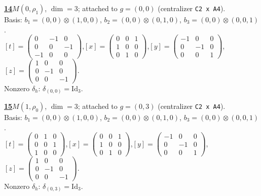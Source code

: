 \begin{samepage}\noindent\textbf{\underline{14}}\quad $M(0,\rho_{1})$, $\dim=3$; attached to $g=(0,0)$ (centralizer \texttt{C2 x A4}).\\
Basis: $b_{1}=(0,0)\otimes (1,0,0)$, $b_{2}=(0,0)\otimes (0,1,0)$, $b_{3}=(0,0)\otimes (0,0,1)$.\\
$[t]=\left(\begin{smallmatrix} 0 & -1 & 0 \\ 0 & 0 & -1 \\ -1 & 0 & 0 \end{smallmatrix}\right)$,\quad $[x]=\left(\begin{smallmatrix} 0 & 0 & 1 \\ 1 & 0 & 0 \\ 0 & 1 & 0 \end{smallmatrix}\right)$,\quad $[y]=\left(\begin{smallmatrix} -1 & 0 & 0 \\ 0 & -1 & 0 \\ 0 & 0 & 1 \end{smallmatrix}\right)$,\quad $[z]=\left(\begin{smallmatrix} 1 & 0 & 0 \\ 0 & -1 & 0 \\ 0 & 0 & -1 \end{smallmatrix}\right)$.\\
Nonzero $\delta_h$: $\delta_{(0,0)}=\mathrm{Id}_{3}$.\end{samepage}
\medskip

\begin{samepage}\noindent\textbf{\underline{15}}\quad $M(1,\rho_{0})$, $\dim=3$; attached to $g=(0,3)$ (centralizer \texttt{C2 x A4}).\\
Basis: $b_{1}=(0,0)\otimes (1,0,0)$, $b_{2}=(0,0)\otimes (0,1,0)$, $b_{3}=(0,0)\otimes (0,0,1)$.\\
$[t]=\left(\begin{smallmatrix} 0 & 1 & 0 \\ 0 & 0 & 1 \\ 1 & 0 & 0 \end{smallmatrix}\right)$,\quad $[x]=\left(\begin{smallmatrix} 0 & 0 & 1 \\ 1 & 0 & 0 \\ 0 & 1 & 0 \end{smallmatrix}\right)$,\quad $[y]=\left(\begin{smallmatrix} -1 & 0 & 0 \\ 0 & -1 & 0 \\ 0 & 0 & 1 \end{smallmatrix}\right)$,\quad $[z]=\left(\begin{smallmatrix} 1 & 0 & 0 \\ 0 & -1 & 0 \\ 0 & 0 & -1 \end{smallmatrix}\right)$.\\
Nonzero $\delta_h$: $\delta_{(0,3)}=\mathrm{Id}_{3}$.\end{samepage}
\medskip

